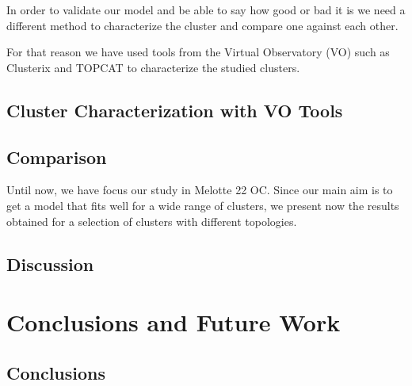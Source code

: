 \documentclass[11pt, a4paper, english]{book}
\begin{document}
In order to validate our model and be able to say how good or bad it is we need a different method to characterize the cluster
and compare one against each other.

For that reason we have used tools from the Virtual Observatory (VO) such as Clusterix and TOPCAT to characterize the studied clusters.

\section{Cluster Characterization with VO Tools}



\section{Comparison}

Until now, we have focus our study in Melotte 22 OC. Since our main aim is to get a model that fits well for a wide range of clusters,
we present now the results obtained for a selection of clusters with different topologies.


\section{Discussion}


\chapter{Conclusions and Future Work}

\section{Conclusions}

\end{document}
